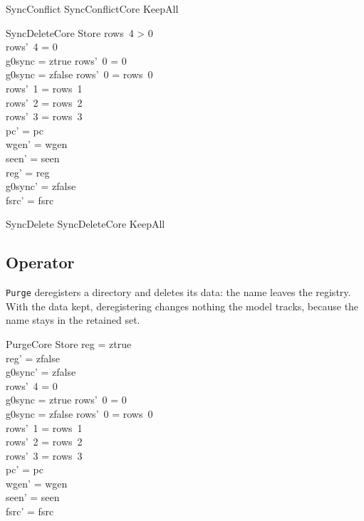 \documentclass[a4paper,10pt,fleqn]{article}
\newcommand{\field}[1]{\texttt{#1}}
\begin{document}
\begin{zed}
SyncConflict  SyncConflictCore \land KeepAll
\end{zed}

\begin{schema}{SyncDeleteCore}
\Delta Store
\where
rows~4 > 0 \\
rows'~4 = 0 \\
g0sync = ztrue \implies rows'~0 = 0 \\
g0sync = zfalse \implies rows'~0 = rows~0 \\
rows'~1 = rows~1 \\
rows'~2 = rows~2 \\
rows'~3 = rows~3 \\
pc' = pc \\
wgen' = wgen \\
seen' = seen \\
reg' = reg \\
g0sync' = zfalse \\
fsrc' = fsrc
\end{schema}

\begin{zed}
SyncDelete  SyncDeleteCore \land KeepAll
\end{zed}

\subsection{Operator}

\field{Purge} deregisters a directory and deletes its data: the name leaves the
registry. With the data kept, deregistering changes nothing the model tracks,
because the name stays in the retained set.

\begin{schema}{PurgeCore}
\Delta Store
\where
reg = ztrue \\
reg' = zfalse \\
g0sync' = zfalse \\
rows'~4 = 0 \\
g0sync = ztrue \implies rows'~0 = 0 \\
g0sync = zfalse \implies rows'~0 = rows~0 \\
rows'~1 = rows~1 \\
rows'~2 = rows~2 \\
rows'~3 = rows~3 \\
pc' = pc \\
wgen' = wgen \\
seen' = seen \\
fsrc' = fsrc
\end{schema}
\end{document}

